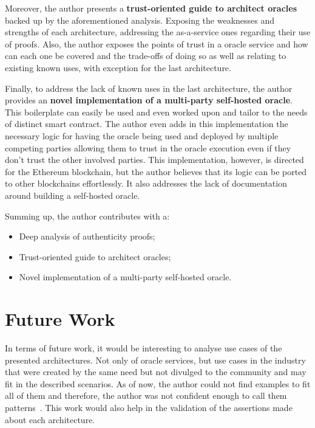 Moreover, the author presents a \textbf{trust-oriented guide to architect oracles} backed up by the aforementioned analysis. Exposing the weaknesses and strengths of each architecture, addressing the as-a-service ones regarding their use of proofs. Also, the author exposes the points of trust in a oracle service and how can each one be covered and the trade-offs of doing so as well as relating to existing known uses, with exception for the last architecture.

Finally, to address the lack of known uses in the last architecture, the author provides an \textbf{novel implementation of a multi-party self-hosted oracle}. This boilerplate can easily be used and even worked upon and tailor to the needs of distinct smart contract. The author even adds in this implementation the necessary logic for having the oracle being used and deployed by multiple competing parties allowing them to trust in the oracle execution even if they don't trust the other involved parties. This implementation, however, is directed for the Ethereum blockchain, but the author believes that its logic can be ported to other blockchains effortlessly. It also addresses the lack of documentation around building a self-hosted oracle.

\vspace{1cm}
Summing up, the author contributes with a:

\begin{itemize}
    \item Deep analysis of authenticity proofs;
    \item Trust-oriented guide to architect oracles;
    \item Novel implementation of a multi-party self-hosted oracle.
\end{itemize}

\section{Future Work}

In terms of future work, it would be interesting to analyse use cases of the presented architectures. Not only of oracle services, but use cases in the industry that were created by the same need but not divulged to the community and may fit in the described scenarios. As of now, the author could not find examples to fit all of them and therefore, the author was not confident enough to call them patterns~\citet{Alexander,Gamma1995}. This work would also help in the validation of the assertions made about each architecture.

